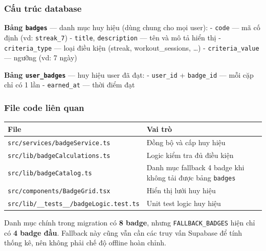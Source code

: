 \documentclass[12pt,a4paper]{article}
\newcounter{none}
\begin{document}
\subsubsection{Cấu trúc database}\label{cux1ea5u-truxfac-database}

\textbf{Bảng \texttt{badges}} --- danh mục huy hiệu (dùng chung cho mọi
user): - \texttt{code} --- mã cố định (vd: \texttt{streak\_7}) -
\texttt{title}, \texttt{description} --- tên và mô tả hiển thị -
\texttt{criteria\_type} --- loại điều kiện (streak, workout\_sessions,
\ldots) - \texttt{criteria\_value} --- ngưỡng (vd: 7 ngày)

\textbf{Bảng \texttt{user\_badges}} --- huy hiệu user đã đạt: -
\texttt{user\_id} + \texttt{badge\_id} --- mỗi cặp chỉ có 1 lần -
\texttt{earned\_at} --- thời điểm đạt

\subsubsection{File code liên quan}\label{file-code-liuxean-quan-1}

{\def\LTcaptype{none} %
\begin{longtable}[]{@{}
  >{\raggedright\arraybackslash}p{}
  >{\raggedright\arraybackslash}p{}@{}}
\toprule\noalign{}
\begin{minipage}[b]{\linewidth}\raggedright
File
\end{minipage} & \begin{minipage}[b]{\linewidth}\raggedright
Vai trò
\end{minipage} \\
\midrule\noalign{}
\endhead
\bottomrule\noalign{}
\endlastfoot
\texttt{src/services/badgeService.ts} & Đồng bộ và cấp huy hiệu \\
\texttt{src/lib/badgeCalculations.ts} & Logic kiểm tra đủ điều kiện \\
\texttt{src/lib/badgeCatalog.ts} & Danh mục fallback 4 badge khi không
tải được bảng \texttt{badges} \\
\texttt{src/components/BadgeGrid.tsx} & Hiển thị lưới huy hiệu \\
\texttt{src/lib/\_\_tests\_\_/badgeLogic.test.ts} & Unit test logic huy
hiệu \\
\end{longtable}
}

Danh mục chính trong migration có \textbf{8 badge}, nhưng
\texttt{FALLBACK\_BADGES} hiện chỉ có \textbf{4 badge đầu}. Fallback này
cũng vẫn cần các truy vấn Supabase để tính thống kê, nên không phải chế
độ offline hoàn chỉnh.
\end{document}

